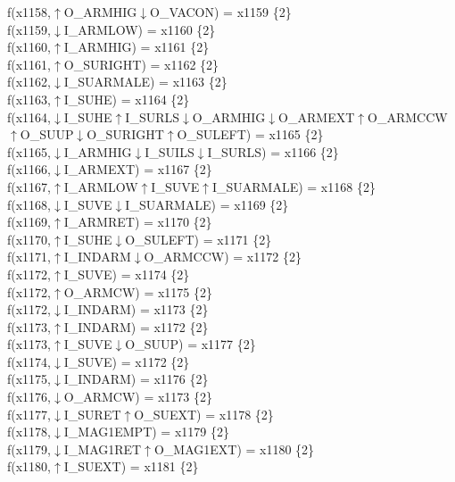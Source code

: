 f(x1158,$\uparrow$O\_ARMHIG$\downarrow$O\_VACON) = x1159 \{2\} \\  
f(x1159,$\downarrow$I\_ARMLOW) = x1160 \{2\} \\  
f(x1160,$\uparrow$I\_ARMHIG) = x1161 \{2\} \\  
f(x1161,$\uparrow$O\_SURIGHT) = x1162 \{2\} \\  
f(x1162,$\downarrow$I\_SUARMALE) = x1163 \{2\} \\  
f(x1163,$\uparrow$I\_SUHE) = x1164 \{2\} \\  
f(x1164,$\downarrow$I\_SUHE$\uparrow$I\_SURLS$\downarrow$O\_ARMHIG$\downarrow$O\_ARMEXT$\uparrow$O\_ARMCCW$\uparrow$O\_SUUP$\downarrow$O\_SURIGHT$\uparrow$O\_SULEFT) = x1165 \{2\} \\  
f(x1165,$\downarrow$I\_ARMHIG$\downarrow$I\_SUILS$\downarrow$I\_SURLS) = x1166 \{2\} \\  
f(x1166,$\downarrow$I\_ARMEXT) = x1167 \{2\} \\  
f(x1167,$\uparrow$I\_ARMLOW$\uparrow$I\_SUVE$\uparrow$I\_SUARMALE) = x1168 \{2\} \\  
f(x1168,$\downarrow$I\_SUVE$\downarrow$I\_SUARMALE) = x1169 \{2\} \\  
f(x1169,$\uparrow$I\_ARMRET) = x1170 \{2\} \\  
f(x1170,$\uparrow$I\_SUHE$\downarrow$O\_SULEFT) = x1171 \{2\} \\  
f(x1171,$\uparrow$I\_INDARM$\downarrow$O\_ARMCCW) = x1172 \{2\} \\  
f(x1172,$\uparrow$I\_SUVE) = x1174 \{2\} \\  
f(x1172,$\uparrow$O\_ARMCW) = x1175 \{2\} \\  
f(x1172,$\downarrow$I\_INDARM) = x1173 \{2\} \\  
f(x1173,$\uparrow$I\_INDARM) = x1172 \{2\} \\  
f(x1173,$\uparrow$I\_SUVE$\downarrow$O\_SUUP) = x1177 \{2\} \\  
f(x1174,$\downarrow$I\_SUVE) = x1172 \{2\} \\  
f(x1175,$\downarrow$I\_INDARM) = x1176 \{2\} \\  
f(x1176,$\downarrow$O\_ARMCW) = x1173 \{2\} \\  
f(x1177,$\downarrow$I\_SURET$\uparrow$O\_SUEXT) = x1178 \{2\} \\  
f(x1178,$\downarrow$I\_MAG1EMPT) = x1179 \{2\} \\  
f(x1179,$\downarrow$I\_MAG1RET$\uparrow$O\_MAG1EXT) = x1180 \{2\} \\  
f(x1180,$\uparrow$I\_SUEXT) = x1181 \{2\} \\  

